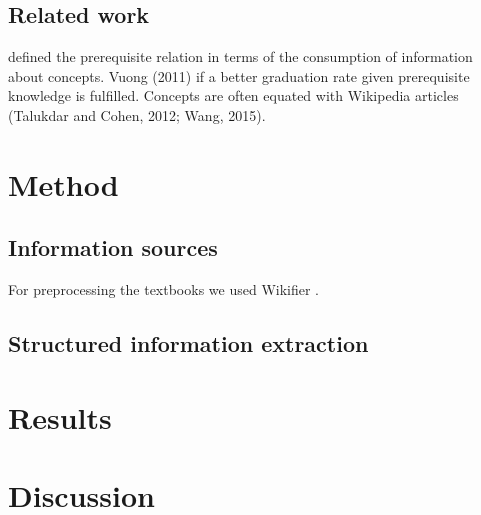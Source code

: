 \documentclass{article}
\begin{document}




\subsection{Related work}
\cite{talukdar2012crowdsourced} defined the prerequisite relation in terms of the consumption of information about concepts. Vuong (2011) if a better graduation rate given prerequisite knowledge is fulfilled. Concepts are often equated with Wikipedia articles (Talukdar and Cohen, 2012; Wang, 2015).

\section{Method}

\subsection{Information sources}
For preprocessing the textbooks we used Wikifier \citep{brank2017annotating}.

\subsection{Structured information extraction}



\section{Results}



\section{Discussion}





\end{document}
